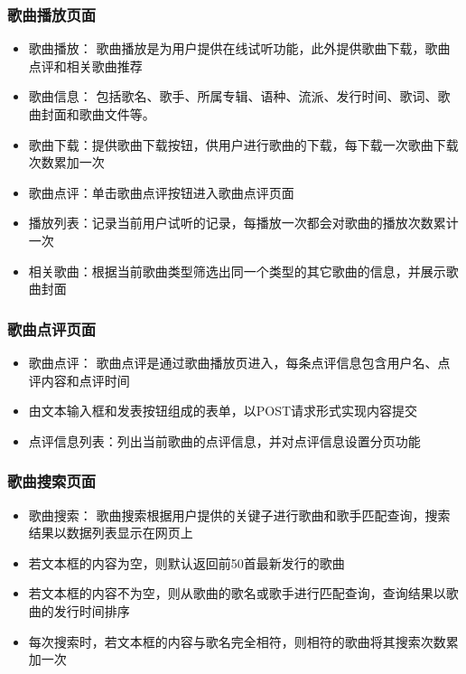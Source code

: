 \documentclass[UTF8,14pt]{article}
\numberwithin{figure}{subsubsection}
\numberwithin{table}{subsubsection}
\begin{document}
\subsubsection{歌曲播放页面}
\begin{itemize}
	\setlength{\itemsep}{0pt}
	      \setlength{\parsep}{0pt}
	      \setlength{\parskip}{0pt}

	\item 歌曲播放：
	      歌曲播放是为用户提供在线试听功能，此外提供歌曲下载，歌曲点评和相关歌曲推荐
	\item 歌曲信息：
	      包括歌名、歌手、所属专辑、语种、流派、发行时间、歌词、歌曲封面和歌曲文件等。
	\item 歌曲下载：提供歌曲下载按钮，供用户进行歌曲的下载，每下载一次歌曲下载次数累加一次
	\item 歌曲点评：单击歌曲点评按钮进入歌曲点评页面
	\item 播放列表：记录当前用户试听的记录，每播放一次都会对歌曲的播放次数累计一次
	\item 相关歌曲：根据当前歌曲类型筛选出同一个类型的其它歌曲的信息，并展示歌曲封面
\end{itemize}
\vspace*{-0.3cm}
\subsubsection{歌曲点评页面}
\begin{itemize}
	\setlength{\itemsep}{0pt}
	      \setlength{\parsep}{0pt}
	      \setlength{\parskip}{0pt}
	\item 歌曲点评：
	      歌曲点评是通过歌曲播放页进入，每条点评信息包含用户名、点评内容和点评时间
	\item 由文本输入框和发表按钮组成的表单，以POST请求形式实现内容提交
	\item 点评信息列表：列出当前歌曲的点评信息，并对点评信息设置分页功能
\end{itemize}
\vspace*{-0.3cm}
\subsubsection{歌曲搜索页面}
\begin{itemize}
	\setlength{\itemsep}{0pt}
	      \setlength{\parsep}{0pt}
	      \setlength{\parskip}{0pt}
	\item 歌曲搜索：
	      歌曲搜索根据用户提供的关键子进行歌曲和歌手匹配查询，搜索结果以数据列表显示在网页上
	\item 若文本框的内容为空，则默认返回前50首最新发行的歌曲
	\item 若文本框的内容不为空，则从歌曲的歌名或歌手进行匹配查询，查询结果以歌曲的发行时间排序
	\item 每次搜索时，若文本框的内容与歌名完全相符，则相符的歌曲将其搜索次数累加一次
\end{itemize}
\vspace*{-0.3cm}
\end{document}
